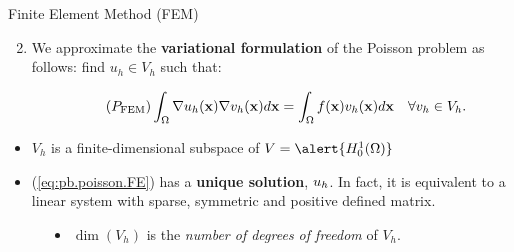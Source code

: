\begin{frame}{Finite Element Method (FEM) \quad {}}
  \begin{enumerate}
    \setcounter{enumi}{1}
  \item We \alert{approximate the \textbf{variational
        formulation}} of the Poisson problem as follows: \alert{find
    $u_h\in V_h$} such that:
    \begin{BlockNoTitle}
      \begin{equation}
        \tag{\ensuremath{P_{\text{FEM}}}}
        \int_\Omega \grad u_h(\xx) \grad v_h(\xx) d\xx = \int_\Omega f(\xx) v_h(\xx) d\xx \quad \forall v_h\in V_h.
        \label{eq:pb.poisson.FE}
      \end{equation}
    \end{BlockNoTitle}
  \end{enumerate}

 \bigskip

  \begin{proposition}
    \begin{itemize}
    \setlength\itemsep{0.7em}
    \item \alert{$V_h$} is a \alert{finite-dimensional} subspace of
        $V=\alert{H_0^1(\Omega)}$
    \item (\ref{eq:pb.poisson.FE}) has a \alert{\textbf{unique
          solution}}, $u_{h}$. In fact, it is \alert{equivalent to a
        linear system} with sparse, symmetric and positive defined
      matrix.
    \end{itemize}
  \end{proposition}

  \medskip\small
  \begin{description}
    \item []
    \begin{itemize}
    \item  $\dim(V_h)$ is the \textit{number of degrees
        of freedom} of $V_h$.
    \end{itemize}
  \end{description}
\end{frame}


